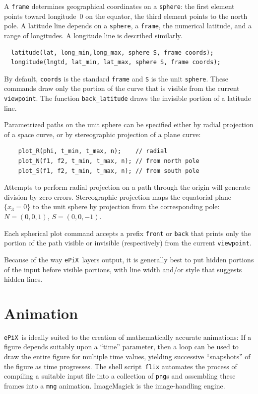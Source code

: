 \documentclass[12pt]{report}
\newcommand{\code}[1]{\texttt{#1}}
\newcommand{\filename}[1]{\texttt{#1}}
\newcommand{\ePiX}{\code{ePiX}}
\begin{document}
A \code{frame} determines geographical coordinates on a \code{sphere}:
the first element points toward longitude~0 on the equator, the third
element points to the north pole.  A latitude line depends on a
\code{sphere}, a \code{frame}, the numerical latitude, and a range of
longitudes. A longitude line is described similarly.
\begin{verbatim}
  latitude(lat, long_min,long_max, sphere S, frame coords);
  longitude(lngtd, lat_min, lat_max, sphere S, frame coords);
\end{verbatim}
By default, \code{coords} is the standard \code{frame} and \code{S} is
the unit \code{sphere}. These commands draw only the portion of the
curve that is visible from the current \code{viewpoint}. The function
\code{back\_latitude} draws the invisible portion of a latitude line.

Parametrized paths on the unit sphere can be specified either by
radial projection of a space curve, or by stereographic projection of
a plane curve:
\begin{verbatim}
    plot_R(phi, t_min, t_max, n);    // radial
    plot_N(f1, f2, t_min, t_max, n); // from north pole
    plot_S(f1, f2, t_min, t_max, n); // from south pole
\end{verbatim}
Attempts to perform radial projection on a path through the origin
will generate division-by-zero errors. Stereographic projection maps
the equatorial plane $\{x_3=0\}$ to the unit sphere by projection from
the corresponding pole: $N=(0,0,1)$, $S=(0,0,-1)$.

Each spherical plot command accepts a prefix \code{front} or
\code{back} that prints only the portion of the path visible or
invisible (respectively) from the current \code{viewpoint}.

Because of the way \ePiX\ layers output, it is generally best to put
hidden portions of the input before visible portions, with line width
and/or style that suggests hidden lines.


\section{Animation}

\label{section:animation}
\ePiX\ is ideally suited to the creation of mathematically accurate
animations: If a figure depends suitably upon a ``time'' parameter,
then a loop can be used to draw the entire figure for multiple time
values, yielding successive ``snapshots'' of the figure as time
progresses. The shell script~\code{flix} automates the process of
compiling a suitable input file into a collection of \filename{png}s
and assembling these frames into a \filename{mng} animation.
ImageMagick is the image-handling engine.
\end{document}
